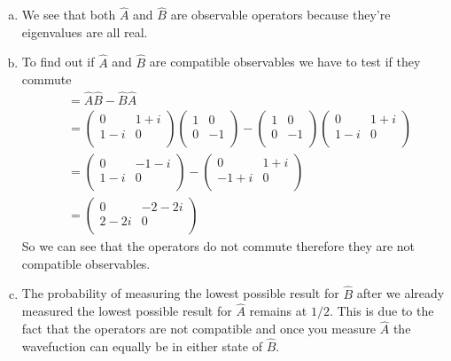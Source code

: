 \documentclass[11pt]{article}
\numberwithin{equation}{section}
\begin{document}
\begin{enumerate}[(a)]
\item
We see that both $\hat{A}$ and $\hat{B}$ are observable operators because they're eigenvalues are all real.

\item
To find out if $\hat{A}$ and $\hat{B}$ are compatible observables we have to test if they commute
\begin{align*}
[\hat{A},\hat{B}] &= \hat{A}\hat{B} - \hat{B}\hat{A}\\
&= \left(\begin{array}{cc}
              0     &1+i\\
              1-i   &0  \\
           \end{array}\right)
   \left(\begin{array}{cc}
              1     &0\\
              0     &-1\\
           \end{array}\right)
-   \left(\begin{array}{cc}
              1     &0\\
              0     &-1\\
           \end{array}\right)
    \left(\begin{array}{cc}
              0     &1+i\\
              1-i   &0  \\
           \end{array}\right)\\
&= \left(\begin{array}{cc}
              0     &-1-i\\
              1-i   &0  \\
           \end{array}\right)
-   \left(\begin{array}{cc}
              0     &1+i\\
              -1+i     &0\\
           \end{array}\right)\\
&= \left(\begin{array}{cc}
              0     &-2-2i\\
              2-2i   &0  \\
           \end{array}\right)
\end{align*}
So we can see that the operators do not commute therefore they are not compatible observables.

\item
The probability of measuring the lowest possible result for $\hat{B}$ after we already measured the lowest possible result for $\hat{A}$ remains at $1/2$. This is due to the fact that the operators are not compatible and once you measure $\hat{A}$ the wavefuction can equally be in either state of $\hat{B}$.
\end{enumerate}
\end{document}

